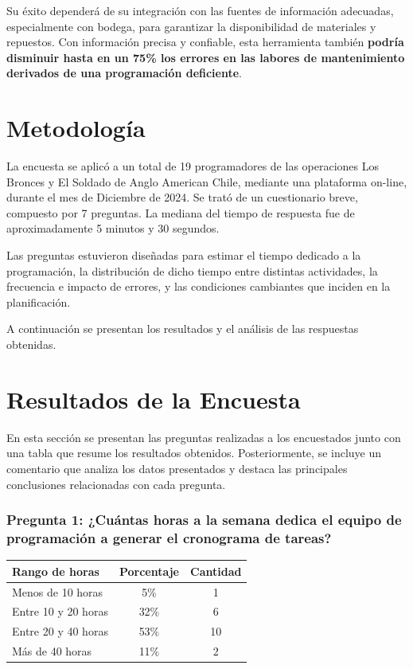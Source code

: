 \documentclass{article}
\begin{document}
\begin{appendix}
    Su éxito dependerá de su integración con las fuentes de información adecuadas, especialmente con bodega, para garantizar la disponibilidad de materiales y repuestos. Con información precisa y confiable, esta herramienta también \textbf{podría disminuir hasta en un 75\% los errores en las labores de mantenimiento derivados de una programación deficiente}.
    
    \section*{Metodología}
    
    La encuesta se aplicó a un total de 19 programadores de las operaciones Los Bronces y El Soldado de Anglo American Chile, mediante una plataforma on-line, durante el mes de Diciembre de 2024. Se trató de un cuestionario breve, compuesto por 7 preguntas. La mediana del tiempo de respuesta fue de aproximadamente 5 minutos y 30 segundos. 
    
    Las preguntas estuvieron diseñadas para estimar el tiempo dedicado a la programación, la distribución de dicho tiempo entre distintas actividades, la frecuencia e impacto de errores, y las condiciones cambiantes que inciden en la planificación.
    
    A continuación se presentan los resultados y el análisis de las respuestas obtenidas.
    
    \section*{Resultados de la Encuesta}
    
    En esta sección se presentan las preguntas realizadas a los encuestados junto con una tabla que resume los resultados obtenidos. Posteriormente, se incluye un comentario que analiza los datos presentados y destaca las principales conclusiones relacionadas con cada pregunta.
    
    \vspace{.5em}
    \subsubsection*{Pregunta 1: ¿Cuántas horas a la semana dedica el equipo de programación a generar el cronograma de tareas?}
    
    
    
    \begin{table}[H]
        \centering
        \begin{tabular}{lcc}
            \toprule
            \textbf{Rango de horas} & \textbf{Porcentaje} & \textbf{Cantidad} \\
            \midrule
            Menos de 10 horas & 5\% & 1 \\
            Entre 10 y 20 horas & 32\% & 6 \\
            Entre 20 y 40 horas & 53\% & 10 \\
            Más de 40 horas & 11\% & 2 \\
            \bottomrule
        \end{tabular}
        \label{tab:horas_semanales}
    \end{table}
    

\end{appendix}
\end{document}
